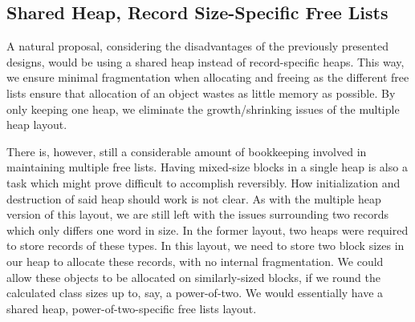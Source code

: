 \subsection{Shared Heap, Record Size-Specific Free Lists}
\label{subsec:shared-heap}
A natural proposal, considering the disadvantages of the previously presented designs, would be using a shared heap instead of record-specific heaps. 
This way, we ensure minimal fragmentation when allocating and freeing as the different free lists ensure that allocation of an object wastes as little memory as possible. By only keeping one heap, we eliminate the growth/shrinking issues of the multiple heap layout. 

There is, however, still a considerable amount of bookkeeping involved in maintaining multiple free lists. Having mixed-size blocks in a single heap is also a task which might prove difficult to accomplish reversibly. How initialization and destruction of said heap should work is not clear. As with the multiple heap version of this layout, we are still left with the issues surrounding two records which only differs one word in size. In the former layout, two heaps were required to store records of these types. In this layout, we need to store two block sizes in our heap to allocate these records, with no internal fragmentation. We could allow these objects to be allocated on similarly-sized blocks, if we round the calculated class sizes up to, say, a power-of-two. We would essentially have a shared heap, power-of-two-specific free lists layout.

